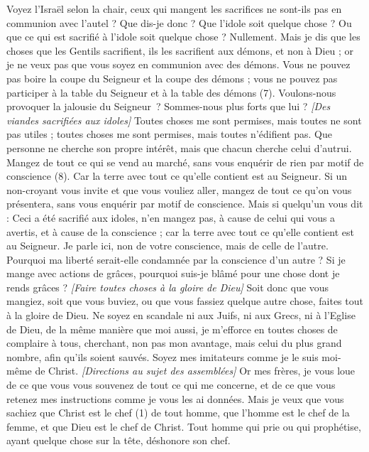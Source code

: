 \begin{multicols}{2}
Voyez l'Israël selon la chair, ceux qui mangent les sacrifices ne sont-ils pas en communion avec l'autel ?
Que dis-je donc ? Que l'idole soit quelque chose ? Ou que ce qui est sacrifié à l'idole soit quelque chose ? Nullement.
Mais je dis que les choses que les Gentils sacrifient, ils les sacrifient aux démons, et non à Dieu ; or je ne veux pas que vous soyez en communion avec des démons.
Vous ne pouvez pas boire la coupe du Seigneur et la coupe des démons ; vous ne pouvez pas participer à la table du Seigneur et à la table des démons (7).
Voulons-nous provoquer la jalousie du Seigneur ? Sommes-nous plus forts que lui ?
\textit{[Des viandes sacrifiées aux idoles]}
Toutes choses me sont permises, mais toutes ne sont pas utiles ; toutes choses me sont permises, mais toutes n'édifient pas.
Que personne ne cherche son propre intérêt, mais que chacun cherche celui d’autrui.
Mangez de tout ce qui se vend au marché, sans vous enquérir de rien par motif de conscience (8).
Car la terre avec tout ce qu'elle contient est au Seigneur.
Si un non-croyant vous invite et que vous vouliez aller, mangez de tout ce qu’on vous présentera, sans vous enquérir par motif de conscience.
Mais si quelqu'un vous dit : Ceci a été sacrifié aux idoles, n'en mangez pas, à cause de celui qui vous a avertis, et à cause de la conscience ; car la terre avec tout ce qu'elle contient est au Seigneur.
Je parle ici, non de votre conscience, mais de celle de l'autre. Pourquoi ma liberté serait-elle condamnée par la conscience d'un autre ?
Si je mange avec actions de grâces, pourquoi suis-je blâmé pour une chose dont je rends grâces ?
\textit{[Faire toutes choses à la gloire de Dieu]}
Soit donc que vous mangiez, soit que vous buviez, ou que vous fassiez quelque autre chose, faites tout à la gloire de Dieu.
Ne soyez en scandale ni aux Juifs, ni aux Grecs, ni à l'Eglise de Dieu,
de la même manière que moi aussi, je m’efforce en toutes choses de complaire à tous, cherchant, non pas mon avantage, mais celui du plus grand nombre, afin qu’ils soient sauvés.
\VerseOne{}Soyez mes imitateurs comme je le suis moi-même de Christ.
\textit{[Directions au sujet des assemblées]}
Or mes frères, je vous loue de ce que vous vous souvenez de tout ce qui me concerne, et de ce que vous retenez mes instructions comme je vous les ai données.
Mais je veux que vous sachiez que Christ est le chef (1) de tout homme, que l’homme est le chef de la femme, et que Dieu est le chef de Christ.
Tout homme qui prie ou qui prophétise, ayant quelque chose sur la tête, déshonore son chef.

\end{multicols}
